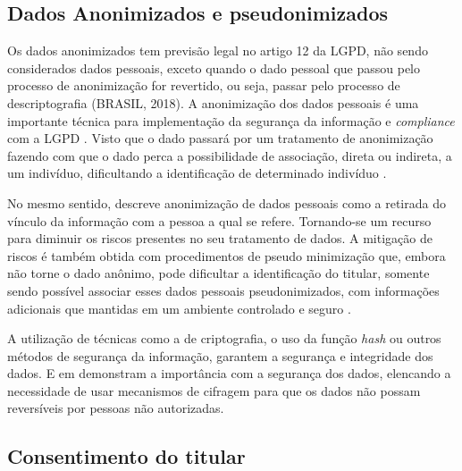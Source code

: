\documentclass[
	12pt,				%
	openright,			%
	oneside,			%
	a4paper,			%
	english,			%
	french,				%
	spanish,			%
	brazil,				%
	]{abntex2}
\begin{document}
\subsection{Dados Anonimizados e pseudonimizados}

Os dados anonimizados tem previsão legal no artigo 12 da LGPD, não sendo considerados dados pessoais, exceto quando o dado pessoal que passou pelo processo de anonimização for revertido, ou seja, passar pelo processo de descriptografia  (BRASIL, 2018). A anonimização dos dados pessoais é uma importante técnica para implementação da segurança da informação e \textit{compliance} com a LGPD \cite{02-01-Maroso2020}. Visto que o dado passará por um tratamento de anonimização fazendo com que o dado perca a possibilidade de associação, direta ou indireta, a um indivíduo, dificultando a identificação de determinado indivíduo \cite{Pinheiro2018}.

No mesmo sentido,  descreve anonimização de dados pessoais como a retirada do vínculo da informação com a pessoa a qual se refere. Tornando-se um recurso para diminuir os riscos presentes no seu tratamento de dados. A mitigação de riscos é também obtida com procedimentos de pseudo minimização que, embora não torne o dado anônimo, pode dificultar a identificação do titular, somente sendo possível associar esses dados pessoais pseudonimizados, com informações adicionais que mantidas em um ambiente controlado e seguro \cite{02-01-Vainzof2020}.

A utilização de técnicas como a de criptografia, o uso da função \textit{hash} ou outros métodos de segurança da informação, garantem a segurança e integridade dos dados. E em  demonstram a importância com a segurança dos dados, elencando a necessidade de usar mecanismos de cifragem para que os dados não possam reversíveis por pessoas não autorizadas.

\subsection{Consentimento do titular}
\end{document}
